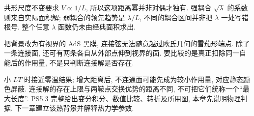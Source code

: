 共形尺度不变要求 $V\propto1/L$, 所以这项距离幂并非对偶才独有. 强耦合 $\sqrt\lambda$ 的系数则来自实际面积解; 弱耦合的领先趋势是 $\lambda/L$, 不同的耦合区间并非把 $\lambda$ 一处写错根号. 整个任意 $\lambda$ 函数仍未由经典面积求出.

把背景改为有视界的 AdS 黑膜, 连接弦无法随意越过欧氏几何的雪茄形端点. 除了一条连接面, 还可有两条各自从外部点伸到视界的面. 要比较的是真正扣除同一自能后的作用量, 不是只判断连接解是否存在.

小 $LT$ 时接近零温结果; 增大距离后, 不连通面可能先成为较小作用量, 对应静态颜色屏蔽. 连接解的存在上限与两鞍点交换优势的距离不同, 不可把它们统称一个“最大长度”. PS5.3 完整给出变分积分、数值比较、转折及所用图, 本章先说明物理判据. 下一章建立该热背景并解释热力学参数.
